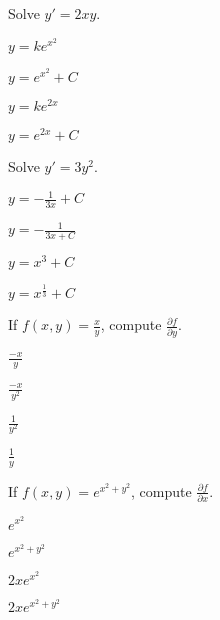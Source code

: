 \begin{readinessAssuranceTest}
\setcounter{enumi}{30}

\item Solve \(y'=2xy\).
\begin{multicols}{4}
\begin{readinessAssuranceTestChoices}
\item \(y=ke^{x^2}\) %
\item \(y=e^{x^2}+C\)
\item \(y=ke^{2x}\)
\item \(y=e^{2x}+C\)
\end{readinessAssuranceTestChoices}
\end{multicols}
\vfill
\item Solve \(y'=3y^2\).
\begin{multicols}{4}
\begin{readinessAssuranceTestChoices}
\item \(y=-\frac{1}{3x}+C\) 
\item \(y=-\frac{1}{3x+C}\)%
\item \(y=x^3+C\)
\item \(y=x^\frac{1}{3}+C\)
\end{readinessAssuranceTestChoices}
\end{multicols}
\vfill


\item If \(f(x,y) = \frac{x}{y}\), compute \(\frac{\partial f}{\partial y}\).
\begin{multicols}{4}
\begin{readinessAssuranceTestChoices}
\item \(\frac{-x}{y}\) 
\item \(\frac{-x}{y^2}\) %
\item \(\frac{1}{y^2}\) 
\item \(\frac{1}{y}\)
\end{readinessAssuranceTestChoices}
\end{multicols}
\vfill

\item If \(f(x,y) = e^{x^2+y^2}\), compute \(\frac{\partial f}{\partial x}\).
\begin{multicols}{4}
\begin{readinessAssuranceTestChoices}
\item \(e^{x^2}\) 
\item \(e^{x^2+y^2}\) 
\item \(2xe^{x^2}\) 
\item \(2xe^{x^2+y^2}\)  %
\end{readinessAssuranceTestChoices}
\end{multicols}
\vfill


\end{readinessAssuranceTest}
